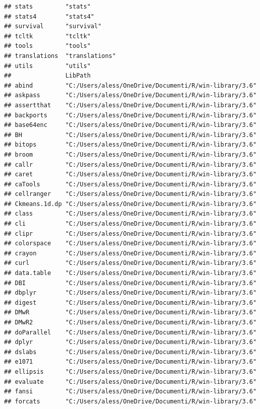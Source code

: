 \documentclass[]{article}
\begin{document}
\begin{verbatim}
## stats         "stats"        
## stats4        "stats4"       
## survival      "survival"     
## tcltk         "tcltk"        
## tools         "tools"        
## translations  "translations" 
## utils         "utils"        
##               LibPath                                              
## abind         "C:/Users/aless/OneDrive/Documenti/R/win-library/3.6"
## askpass       "C:/Users/aless/OneDrive/Documenti/R/win-library/3.6"
## assertthat    "C:/Users/aless/OneDrive/Documenti/R/win-library/3.6"
## backports     "C:/Users/aless/OneDrive/Documenti/R/win-library/3.6"
## base64enc     "C:/Users/aless/OneDrive/Documenti/R/win-library/3.6"
## BH            "C:/Users/aless/OneDrive/Documenti/R/win-library/3.6"
## bitops        "C:/Users/aless/OneDrive/Documenti/R/win-library/3.6"
## broom         "C:/Users/aless/OneDrive/Documenti/R/win-library/3.6"
## callr         "C:/Users/aless/OneDrive/Documenti/R/win-library/3.6"
## caret         "C:/Users/aless/OneDrive/Documenti/R/win-library/3.6"
## caTools       "C:/Users/aless/OneDrive/Documenti/R/win-library/3.6"
## cellranger    "C:/Users/aless/OneDrive/Documenti/R/win-library/3.6"
## Ckmeans.1d.dp "C:/Users/aless/OneDrive/Documenti/R/win-library/3.6"
## class         "C:/Users/aless/OneDrive/Documenti/R/win-library/3.6"
## cli           "C:/Users/aless/OneDrive/Documenti/R/win-library/3.6"
## clipr         "C:/Users/aless/OneDrive/Documenti/R/win-library/3.6"
## colorspace    "C:/Users/aless/OneDrive/Documenti/R/win-library/3.6"
## crayon        "C:/Users/aless/OneDrive/Documenti/R/win-library/3.6"
## curl          "C:/Users/aless/OneDrive/Documenti/R/win-library/3.6"
## data.table    "C:/Users/aless/OneDrive/Documenti/R/win-library/3.6"
## DBI           "C:/Users/aless/OneDrive/Documenti/R/win-library/3.6"
## dbplyr        "C:/Users/aless/OneDrive/Documenti/R/win-library/3.6"
## digest        "C:/Users/aless/OneDrive/Documenti/R/win-library/3.6"
## DMwR          "C:/Users/aless/OneDrive/Documenti/R/win-library/3.6"
## DMwR2         "C:/Users/aless/OneDrive/Documenti/R/win-library/3.6"
## doParallel    "C:/Users/aless/OneDrive/Documenti/R/win-library/3.6"
## dplyr         "C:/Users/aless/OneDrive/Documenti/R/win-library/3.6"
## dslabs        "C:/Users/aless/OneDrive/Documenti/R/win-library/3.6"
## e1071         "C:/Users/aless/OneDrive/Documenti/R/win-library/3.6"
## ellipsis      "C:/Users/aless/OneDrive/Documenti/R/win-library/3.6"
## evaluate      "C:/Users/aless/OneDrive/Documenti/R/win-library/3.6"
## fansi         "C:/Users/aless/OneDrive/Documenti/R/win-library/3.6"
## forcats       "C:/Users/aless/OneDrive/Documenti/R/win-library/3.6"

\end{verbatim}
\end{document}
